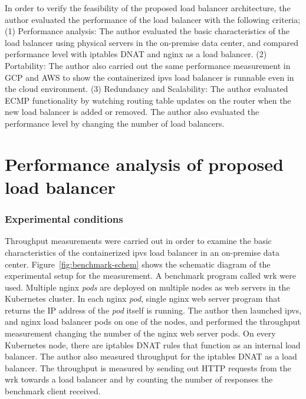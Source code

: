 
In order to verify the feasibility of the proposed load balancer architecture, the author evaluated the performance of the load balancer with the following criteria;
(1) Performance analysis:
The author evaluated the basic characteristics of the load balancer using physical servers in the on-premise data center, and compared performance level with iptables DNAT and nginx as a load balancer.
(2) Portability:
The author also carried out the same performance measurement in GCP and AWS to show the containerized ipvs load balancer is runnable even in the cloud environment.
(3) Redundancy and Scalability:
The author evaluated ECMP functionality by watching routing table updates on the router when the new load balancer is added or removed.
The author also evaluated the performance level by changing the number of load balancers.

\section{Performance analysis of proposed load balancer}

\subsubsection{Experimental conditions}

Throughput measurements were carried out in order to examine the basic characteristics of the containerized ipvs load balancer in an on-premise data center.
Figure~\ref{fig:benchmark-schem} shows the schematic diagram of the experimental setup for the measurement.
A benchmark program called wrk\cite{Glozer2016} were used.
Multiple nginx {\em pods} are deployed on multiple nodes as web servers in the Kubernetes cluster.
In each nginx {\em pod}, single nginx web server program that returns the IP address of the {\em pod} itself is running.
The author then launched ipvs, and nginx load balancer pods on one of the nodes, and performed the throughput measurement changing the number of the nginx web server pods.
On every Kubernetes node, there are iptables DNAT rules that function as an internal load balancer.
The author also measured throughput for the iptables DNAT as a load balancer.
The throughput is measured by sending out HTTP requests from the wrk towards a load balancer and by counting the number of responses the benchmark client received.

